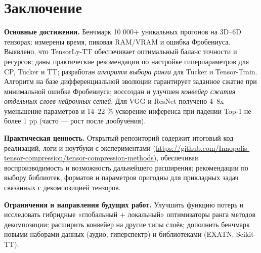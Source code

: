 \chapter{Заключение}
\label{chap:conclusion}

\textbf{Основные достижения.} Бенчмарк 10 000+ уникальных прогонов на 3D–6D тензорах: измерены время, пиковая RAM/VRAM и ошибка Фробениуса. Выявлено, что TensorLy-TT обеспечивает оптимальный баланс точности и ресурсов; даны практические рекомендации по настройке гиперпараметров для CP, Tucker и TT; разработан \emph{алгоритм выбора ранга} для Tucker и Tensor-Train. Алгоритм на базе дифференциальной эволюции гарантирует заданное сжатие при минимальной ошибке Фробениуса; воссоздан и улучшен \emph{конвейер сжатия отдельных слоев нейронных сетей}. Для VGG и ResNet получено 4–8x уменьшение параметров и 14–22 \% ускорение инференса при падении Top-1 не более 1 pp (часто — рост после дообучения).

\textbf{Практическая ценность.} Открытый репозиторий содержит итоговый код реализаций, логи и ноутбуки с экспериментами (\url{https://github.com/Innopolis-tensor-compression/tensor-compression-methods}), обеспечивая воспроизводимость и возможность дальнейшего расширения; рекомендации по выбору библиотек, форматов и параметров пригодны для прикладных задач связанных с декомпозицией тензоров.

\textbf{Ограничения и направления будущих работ.} Улучшить функцию потерь и исследовать гибридные «глобальный + локальный» оптимизаторы ранга методов декомпозиции; расширить конвейер на другие типы слоёв; дополнить бенчмарк новыми наборами данных (аудио, гиперспектр) и библиотеками (EXATN, Scikit-TT).